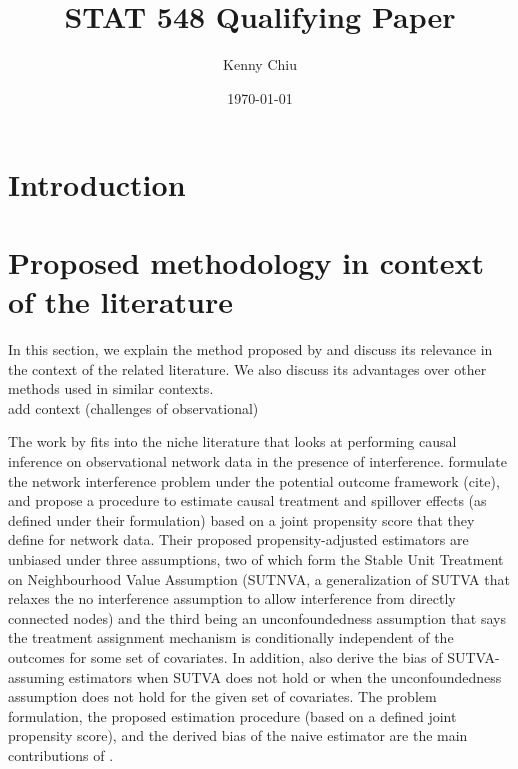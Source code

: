 \documentclass[10pt]{article}
\title{\todo\\\vspace{0.5em}\large{STAT 548 Qualifying Paper}}
\author{Kenny Chiu}
\date{\today}
\begin{document}
\maketitle

\vspace{2em}

\begin{abstract}
\todo
\end{abstract}

\vspace{2em}


\section{Introduction}


\section{Proposed methodology in context of the literature}

\todo In this section, we explain the method proposed by \textcite{Forastiere:2021} and discuss its relevance in the context of the related literature. We also discuss its advantages over other methods used in similar contexts.
\\

\todo add context (challenges of observational)

The work by \textcite{Forastiere:2021} fits into the niche literature that looks at performing causal inference on observational network data in the presence of interference. \textcite{Forastiere:2021} formulate the network interference problem under the potential outcome framework (\todo cite), and propose a procedure to estimate causal treatment and spillover effects (as defined under their formulation) based on a joint propensity score that they define for network data. Their proposed propensity-adjusted estimators are unbiased under three assumptions, two of which form the Stable Unit Treatment on Neighbourhood Value Assumption (SUTNVA, a generalization of SUTVA that relaxes the no interference assumption to allow interference from directly connected nodes) and the third being an unconfoundedness assumption that says the treatment assignment mechanism is conditionally independent of the outcomes for some set of covariates. In addition, \textcite{Forastiere:2021} also derive the bias of SUTVA-assuming estimators when SUTVA does not hold or when the unconfoundedness assumption does not hold for the given set of covariates. The problem formulation, the proposed estimation procedure (based on a defined joint propensity score), and the derived bias of the naive estimator are the main contributions of \citeauthor{Forastiere:2021}.
\\
\end{document}
